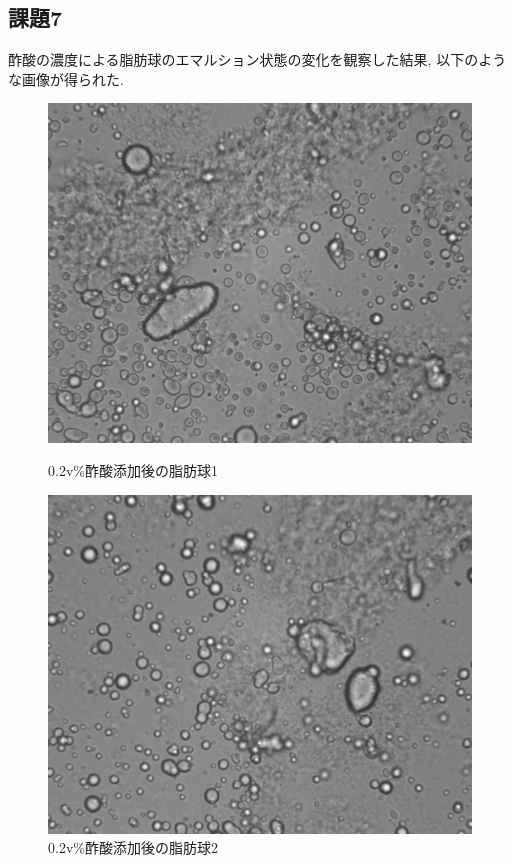 \documentclass[11pt]{ltjsarticle}
\begin{document}
    \subsection*{課題7}
      酢酸の濃度による脂肪球のエマルション状態の変化を観察した結果, 以下のような画像が得られた.\\
      \begin{figure}[H]
        \centering
        \begin{minipage}{0.48\textwidth}
          \centering
          \includegraphics[width=\linewidth]{mizumoto_0.2_1.png}
          \caption{0.2v\%酢酸添加後の脂肪球1}
          \label{fig:milk0.2_1}
        \end{minipage}
        \hfill
        \begin{minipage}{0.48\textwidth}
          \centering
          \includegraphics[width=\linewidth]{mizumoto_0.2_2.png}
          \caption{0.2v\%酢酸添加後の脂肪球2}
          \label{fig:milk0.2_2}
        \end{minipage}
      \end{figure}
\end{document}
